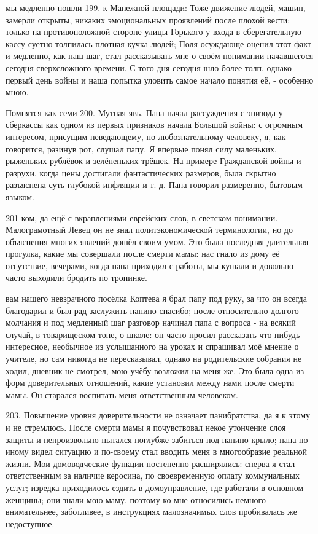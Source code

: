 мы медленно пошли 199. к Манежной площади: Тоже движение людей, машин, замерли открыты, никаких эмоциональных проявлений после плохой вести; только на противоположной стороне улицы Горького у входа в сберегательную кассу суетно толпилась плотная кучка людей; Поля осуждающе оценил этот факт и медленно, как наш шаг, стал рассказывать мне о своём понимании начавшегося сегодня сверхсложного времени. С того дня сегодня шло более толп, однако первый день войны и наша попытка уловить самое начало понятия её, - особенно мною.

Помнятся как семи 200. Мутная явь. Папа начал рассуждения с эпизода у сберкассы как одном из первых признаков начала Большой войны: с огромным интересом, присущим неведающему, но любознательному человеку, я, как говорится, разинув рот, слушал папу. Я впервые понял силу маленьких, рыженьких рублёвок и зелёненьких трёшек. На примере Гражданской войны и разрухи, когда цены достигали фантастических размеров, была скрытно разъяснена суть глубокой инфляции и т. д. Папа говорил размеренно, бытовым языком.

201 ком, да ещё с вкраплениями еврейских слов, в светском понимании. Малограмотный Левец он не знал политэкономической терминологии, но до объяснения многих явлений дошёл своим умом. Это была последняя длительная прогулка, какие мы совершали после смерти мамы: нас гнало из дому её отсутствие, вечерами, когда папа приходил с работы, мы кушали и довольно часто выходили бродить по тропинке.

вам нашего невзрачного посёлка Коптева я брал папу под руку, за что он всегда благодарил и был рад заслужить папино спасибо; после относительно долгого молчания и под медленный шаг разговор начинал папа с вопроса - на всякий случай, в товарищеском тоне, о школе: он часто просил рассказать что-нибудь интересное, необычное из услышанного на уроках и спрашивал моё мнение о учителе, но сам никогда не пересказывал, однако на родительские собрания не ходил, дневник не смотрел, мою учёбу возложил на меня же. Это была одна из форм доверительных отношений, какие установил между нами после смерти мамы. Он старался воспитать меня ответственным человеком.

203. Повышение уровня доверительности не означает панибратства, да я к этому и не стремлюсь. После смерти мамы я почувствовал некое утончение слоя защиты и непроизвольно пытался поглубже забиться под папино крыло; папа по-иному видел ситуацию и по-своему стал вводить меня в многообразие реальной жизни. Мои домоводческие функции постепенно расширялись: сперва я стал ответственным за наличие керосина, по своевременную оплату коммунальных услуг; изредка приходилось ездить в домоуправление, где работали в основном женщины; они знали мою маму, поэтому ко мне относились немного внимательнее, заботливее, в инструкциях малозначимых слов пробивалась же недоступное.

